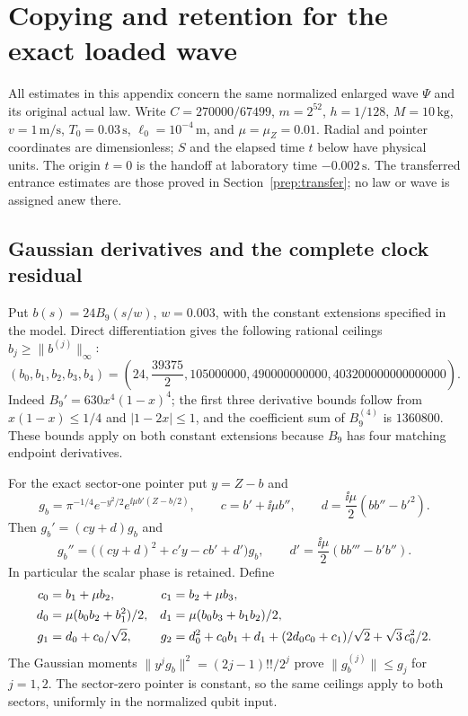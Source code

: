 \documentclass[11pt]{article}
\theoremstyle{definition}\newtheorem{definition}[theorem]{Definition}
\theoremstyle{remark}\newtheorem{remark}[theorem]{Remark}
\begin{document}
\section{Copying and retention for the exact loaded wave}\label{hold:appendix}\label{hold:main}

All estimates in this appendix concern the same normalized enlarged wave
$\Psi$ and its original actual law.  Write $C=270000/67499$,
$m=2^{52}$, $h=1/128$, $M=10\,\mathrm{kg}$, $v=1\,\mathrm{m/s}$,
$T_0=0.03\,\mathrm s$, $\ell_0=10^{-4}\,\mathrm m$, and
$\mu=\mu_Z=0.01$.  Radial and pointer coordinates are dimensionless;
$S$ and the elapsed time $t$ below have physical units.  The origin
$t=0$ is the handoff at laboratory time $-0.002\,\mathrm s$.
The transferred entrance estimates are those proved in
Section~\ref{prep:transfer}; no law or wave is assigned anew there.

\subsection{Gaussian derivatives and the complete clock residual}
Put $b(s)=24B_9(s/w)$, $w=0.003$, with the constant extensions specified
in the model.  Direct differentiation gives the following rational
ceilings $b_j\geq\|b^{(j)}\|_\infty$:
\begin{equation}\label{hold:bjets}
 (b_0,b_1,b_2,b_3,b_4)
 =\left(24,\frac{39375}{2},105000000,
            490000000000,403200000000000000\right).
\end{equation}
Indeed $B_9'=630x^4(1-x)^4$; the first three derivative bounds follow
from $x(1-x)\leq1/4$ and $|1-2x|\leq1$, and the coefficient sum of
$B_9^{(4)}$ is $1360800$.  These bounds apply on both constant
extensions because $B_9$ has four matching endpoint derivatives.

For the exact sector-one pointer put $y=Z-b$ and
\[
 g_b=\pi^{-1/4}e^{-y^2/2}
       e^{\ii\mu b'(Z-b/2)},\qquad
 c=b'+\ii\mu b'',\qquad d=\frac{\ii\mu}{2}(bb''-b'^2).
\]
Then $g_b'=(cy+d)g_b$ and
\[
 g_b''=\bigl((cy+d)^2+c'y-cb'+d'\bigr)g_b,
 \qquad d'=\frac{\ii\mu}{2}(bb'''-b'b'').
\]
In particular the scalar phase is retained.  Define
\begin{align}
 c_0&=b_1+\mu b_2,&c_1&=b_2+\mu b_3,\notag\\
 d_0&=\mu(b_0b_2+b_1^2)/2,&
 d_1&=\mu(b_0b_3+b_1b_2)/2,\notag\\
 g_1&=d_0+c_0/\sqrt2,&
 g_2&=d_0^2+c_0b_1+d_1
       +(2d_0c_0+c_1)/\sqrt2+\sqrt3\,c_0^2/2.
 \label{hold:gjets}
\end{align}
The Gaussian moments $\|y^j g_b\|^2=(2j-1)!!/2^j$ prove
$\|g_b^{(j)}\|\leq g_j$ for $j=1,2$.
The sector-zero pointer is constant, so the same ceilings apply to
both sectors, uniformly in the normalized qubit input.
\end{document}
